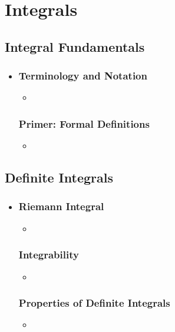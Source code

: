 \chapter{Integrals}

\section{Integral Fundamentals}
\begin{itemize}
  \item []

  \subsection{Terminology and Notation}
  \begin{itemize}
    \item 
  \end{itemize}

  \subsection{Primer: Formal Definitions}
  \begin{itemize}
    \item 
  \end{itemize}
  
\end{itemize}

\section{Definite Integrals}
\begin{itemize}
  \item []
  
  \subsection{Riemann Integral}
  \begin{itemize}
    \item 
  \end{itemize}

  \subsection{Integrability}
  \begin{itemize}
    \item 
  \end{itemize}
  
  \subsection{Properties of Definite Integrals}
  \begin{itemize}
    \item 
  \end{itemize}
  
\end{itemize}

